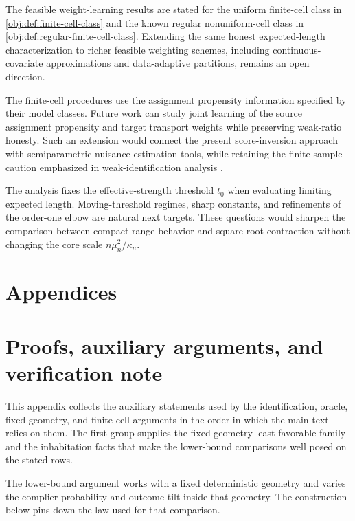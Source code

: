 \documentclass[11pt]{article}
\begin{document}
The feasible weight-learning results are stated for the uniform finite-cell class in \cref{obj:def:finite-cell-class} and the known regular nonuniform-cell class in \cref{obj:def:regular-finite-cell-class}. Extending the same honest expected-length characterization to richer feasible weighting schemes, including continuous-covariate approximations and data-adaptive partitions, remains an open direction.

The finite-cell procedures use the assignment propensity information specified by their model classes. Future work can study joint learning of the source assignment propensity and target transport weights while preserving weak-ratio honesty. Such an extension would connect the present score-inversion approach with semiparametric nuisance-estimation tools, while retaining the finite-sample caution emphasized in weak-identification analysis \citep{ArmstrongKolesar2021}.

The analysis fixes the effective-strength threshold \(t_0\) when evaluating limiting expected length. Moving-threshold regimes, sharp constants, and refinements of the order-one elbow are natural next targets. These questions would sharpen the comparison between compact-range behavior and square-root contraction without changing the core scale \(n\mu_n^2/\kappa_n\).


\appendix

\section*{Appendices}

\section{Proofs, auxiliary arguments, and verification note}

This appendix collects the auxiliary statements used by the identification, oracle, fixed-geometry, and finite-cell arguments in the order in which the main text relies on them. The first group supplies the fixed-geometry least-favorable family and the inhabitation facts that make the lower-bound comparisons well posed on the stated rows.

The lower-bound argument works with a fixed deterministic geometry and varies the complier probability and outcome tilt inside that geometry. The construction below pins down the law used for that comparison.
\end{document}
